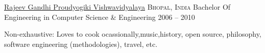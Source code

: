 \documentclass[10pt,a4paper]{article}
\begin{document}
\headedsection
  {\href{http://www.rgpv.ac.in}{Rajeev Gandhi Proudyogiki Vishwavidyalaya}}
  {\textsc{Bhopal, India}} {%
  \headedsubsection
    {Bachelor Of Engineering in Computer Science \& Engineering}
    {2006 -- 2010} {}
}



\spacedhrule{0.5em}{-0.4em}


\inlineheadsection
  {Non-exhaustive:}
  {Loves to cook ocassionally,music,history, open source, philosophy, software engineering (methodologies), travel, etc.}
\end{document}

